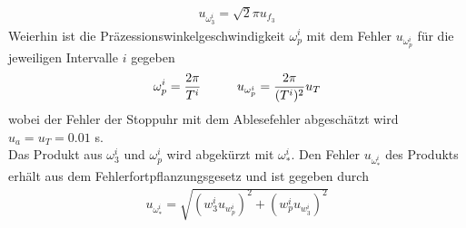 \begin{align}
    u_{\omega_3^i}=\sqrt{2}\pi u_{f_3}
\end{align}
Weierhin ist die Präzessionswinkelgeschwindigkeit $\omega_p^i$ mit dem Fehler $u_{\omega_p^i}$ für die jeweiligen Intervalle $i$ gegeben 
\begin{gather}
    \omega_p^i=\frac{2\pi}{T^i}\tab u_{\omega_p^i}=\frac{2\pi}{(T^i)^2}u_T
\end{gather}
wobei der Fehler der Stoppuhr mit dem Ablesefehler abgeschätzt wird $u_a=u_T=0.01$ s.\\
Das Produkt aus $\omega_3^i$ und $\omega_p^i$ wird abgekürzt mit $\omega_*^i$. Den Fehler $u_{\omega_*^i}$ des Produkts erhält aus dem Fehlerfortpflanzungsgesetz und ist gegeben durch
\begin{align}
    u_{\omega_\ast^i}=\sqrt{(w_3^i u_{w_p^i})^2+(w_p^i u_{w_3^i})^2}
\end{align}
